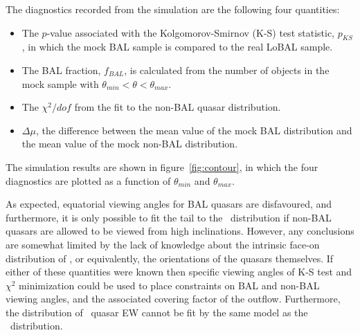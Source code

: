 The diagnostics recorded from the simulation are the following four
quantities:
\begin{itemize}
	\item The $p$-value associated with the Kolgomorov-Smirnov (K-S) 
	test statistic, $p_{KS}$, in which the mock BAL sample is compared
	to the real LoBAL sample.
	\item The BAL fraction, $f_{BAL}$, is calculated from the 
	number of objects in the mock sample with $\theta_{min}<\theta<\theta_{max}$.
	\item The $\chi^2/dof$ from the fit to the non-BAL quasar distribution.
	\item $\Delta \mu$, the difference between the mean value of the mock BAL
	distribution and the mean value of the mock non-BAL distribution.
\end{itemize}
The simulation results are shown in figure~\ref{fig:contour}, in which the 
four diagnostics are plotted as a function of $\theta_{min}$ 
and $\theta_{max}$. 

As expected, equatorial viewing angles for BAL quasars 
are disfavoured, and furthermore, it is only possible to fit
the tail to the \ewo\ distribution if non-BAL quasars are allowed 
to be viewed from high inclinations. However, any conclusions
are somewhat limited by the lack of knowledge about the 
intrinsic face-on distribution of \ewo, or equivalently,
the orientations of the quasars themselves. If either of these
quantities were known then specific viewing angles of
K-S test and $\chi^2$ minimization could be used
to place constraints on BAL and non-BAL viewing angles, and the
associated covering factor of the outflow.
Furthermore, the distribution of \civ\ quasar EW cannot be fit by 
the same model as the \ewo\ distribution.


